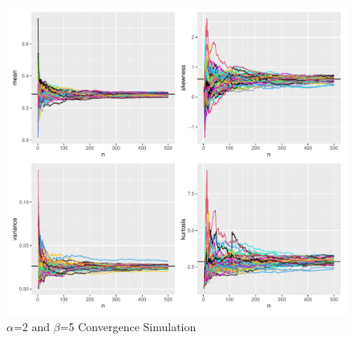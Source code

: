 \documentclass{article}\usepackage[]{graphicx}\usepackage[]{xcolor}
\begin{document}
\begin{figure}[ht]
  \begin{center}
  \includegraphics[width=\textwidth]{Rplot.pdf}
  \caption{$\alpha$=2 and $\beta$=5 Convergence Simulation}
  \label{plot1}
  \end{center}
\end{figure}
\end{document}
